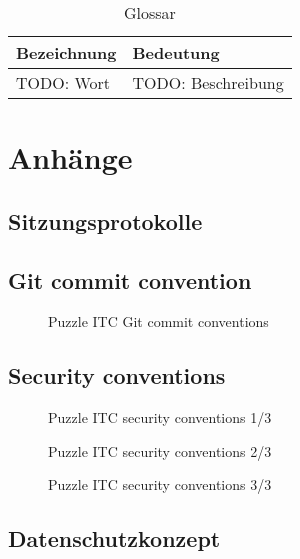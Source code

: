 \begin{table}[H]
    \begin{tabular}{|L{0.3\textwidth}|L{0.6\textwidth}|}
        \hline
         \textbf{\color{white}Bezeichnung} & \textbf{\color{white}Bedeutung} \\[12pt]
        \hline
        TODO: Wort & TODO: Beschreibung \\
        \hline
    \end{tabular}
    \caption{Glossar}
\end{table}

\chapter{Anhänge}

\section{Sitzungsprotokolle}

\section{Git commit convention}
\label{sec:gitconv}
\begin{figure}[h]
    \centering
    \caption{Puzzle ITC Git commit conventions}
    \end{figure}

\section{Security conventions}
\label{sec:secconv}
\begin{figure}[h]
    \centering
    \caption{Puzzle ITC security conventions 1/3}
    \end{figure}
\begin{figure}[h]
    \centering
    \caption{Puzzle ITC security conventions 2/3 }
    \end{figure}  
\begin{figure}[h]
    \centering
    \caption{Puzzle ITC security conventions 3/3}
    \end{figure}  

\section{Datenschutzkonzept}
\label{sec:datsec}





